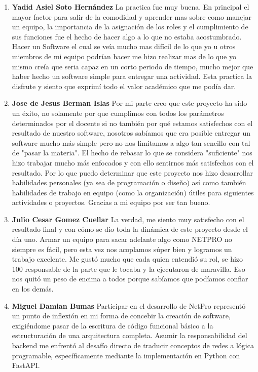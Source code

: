 \documentclass[11pt,letterpaper,oneside]{article}
\begin{document}
\begin{enumerate}[leftmargin=1.5em,itemsep=2pt]
  \item \textbf{Yadid Asiel Soto Hernández}
  La practica fue muy buena. En principal el mayor factor para salir de la comodidad y aprender mas sobre como manejar un equipo, la importancia de la asignación de los roles y el cumplimiento de sus funciones fue el hecho de hacer algo a lo que no estaba acostumbrado. Hacer un Software el cual se veía mucho mas difícil de lo que yo u otros miembros de mi equipo podrían hacer me hizo realizar mas de lo que yo mismo creía que seria capaz en un corto periodo de tiempo, mucho mejor que haber hecho un software simple para entregar una actividad. Esta practica la disfrute y siento que exprimí todo el valor académico que me podía dar. 
  \item \textbf{Jose de Jesus Berman Islas}
  Por mi parte creo que este proyecto ha sido un éxito, no solamente por que cumplimos con todos los parámetros determinados por el docente si no también por qué estamos satisfechos con el resultado de nuestro software, nosotros sabíamos que era posible entregar un software mucho más simple pero no nos limitamos a algo tan sencillo con tal de "pasar la materia". El hecho de rebasar lo que se considera "suficiente" nos hizo trabajar mucho más enfocados y con ello sentirnos más satisfechos con el resultado. Por lo que puedo determinar que este proyecto nos hizo desarrollar habilidades personales (ya sea de programación o diseño) así como también habilidades de trabajo en equipo (como la organización) útiles para siguientes actividades o proyectos.
Gracias a mi equipo por ser tan bueno.
\item \textbf{Julio Cesar Gomez Cuellar}
La verdad, me siento muy satisfecho con el resultado final y con cómo se dio toda la dinámica de este proyecto desde el día uno. Armar un equipo para sacar adelante algo como NETPRO no siempre es fácil, pero esta vez nos acoplamos súper bien y logramos un trabajo excelente. Me gustó mucho que cada quien entendió su rol, se hizo 100 responsable de la parte que le tocaba y la ejecutaron de maravilla. Eso nos quitó un peso de encima a todos porque sabíamos que podíamos confiar en los demás.
\item \textbf{Miguel Damian Bumas}
Participar en el desarrollo de NetPro representó un punto de inflexión en mi forma de concebir la creación de software, exigiéndome pasar de la escritura de código funcional básico a la estructuración de una arquitectura completa. Asumir la responsabilidad del backend me enfrentó al desafío directo de traducir conceptos de redes a lógica programable, específicamente mediante la implementación en Python con FastAPI.

\end{enumerate}
\end{document}
